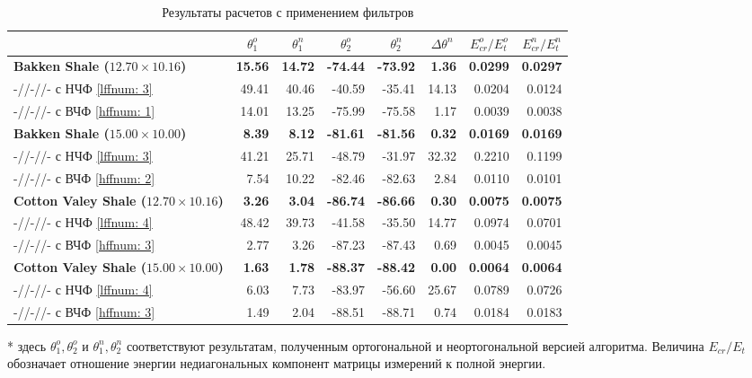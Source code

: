 \documentclass[a4paper,11pt]{article}
\begin{document}
\begin{table}[h]
\footnotesize
\centering
\caption{Результаты расчетов с применением фильтров}
\renewcommand{\arraystretch}{1.5}
\begin{tabularx}{\textwidth}{|X|rr|rr|r|rr|}
\hline
				&\multicolumn{1}{c}{$\theta_1^o$} & \multicolumn{1}{c|}{$\theta_1^n$} & \multicolumn{1}{c}{$\theta_2^o$} & \multicolumn{1}{c|}{$\theta_2^n$} & \multicolumn{1}{c|}{$\Delta\theta^n$}& \multicolumn{1}{c}{$E_{cr}^o/E_{t}^o$} & \multicolumn{1}{c|}{$E_{cr}^n/E_{t}^n$} \\ \hline
\hline	\textbf{Bakken Shale ($12.70 \times 10.16$)} & \textbf{15.56} & \textbf{14.72} & \textbf{-74.44}  & \textbf{-73.92}  & \textbf{1.36}  & \textbf{0.0299} & \textbf{0.0297} \\
		-//-//- с НЧФ \ref{lffnum: 3} & 49.41 & 40.46 & -40.59 & -35.41  & 14.13 & 0.0204 & 0.0124\\
		-//-//- с ВЧФ \ref{hffnum: 1} & 14.01 & 13.25 & -75.99 & -75.58  & 1.17 & 0.0039 & 0.0038\\
\hline	\textbf{Bakken Shale ($15.00 \times 10.00$)} & \textbf{8.39} & \textbf{8.12} & \textbf{-81.61}  & \textbf{-81.56} & \textbf{0.32}  & \textbf{0.0169} & \textbf{0.0169} \\
		-//-//- с НЧФ \ref{lffnum: 3} & 41.21 & 25.71 & -48.79 & -31.97  & 32.32 & 0.2210 & 0.1199\\
		-//-//- с ВЧФ \ref{hffnum: 2} & 7.54 & 10.22 & -82.46 & -82.63  & 2.84 & 0.0110 & 0.0101\\
\hline	\textbf{Cotton Valey Shale ($12.70 \times 10.16$)} & \textbf{3.26} & \textbf{3.04} & \textbf{-86.74}  & \textbf{-86.66}  & \textbf{0.30}  & \textbf{0.0075} & \textbf{0.0075}\\
		-//-//- с НЧФ \ref{lffnum: 4} & 48.42 & 39.73 & -41.58 & -35.50  & 14.77  & 0.0974 & 0.0701 \\
		-//-//- с ВЧФ \ref{hffnum: 3} & 2.77 & 3.26 & -87.23 & -87.43  & 0.69  & 0.0045 & 0.0045\\	
\hline	\textbf{Cotton Valey Shale ($15.00 \times 10.00$)} & \textbf{1.63} & \textbf{1.78} & \textbf{-88.37}  & \textbf{-88.42}  & \textbf{0.00}  & \textbf{0.0064} & \textbf{0.0064} \\
		-//-//- с НЧФ \ref{lffnum: 4} & 6.03 & 7.73 & -83.97 & -56.60  & 25.67  & 0.0789 & 0.0726 \\
		-//-//- с ВЧФ \ref{hffnum: 3} & 1.49 & 2.04 & -88.51 & -88.71  & 0.74  & 0.0184 & 0.0183\\		
\hline	
\end{tabularx} 
\begin{flushleft}
* здесь $\theta_1^o,\theta_2^o$ и $\theta_1^n,\theta_2^n$ соответствуют результатам, полученным ортогональной и неортогональной версией алгоритма. Величина $E_{cr}/E_{t}$ обозначает отношение энергии недиагональных компонент матрицы измерений к полной энергии.
\end{flushleft}
\label{tab:filter_process_results}
\renewcommand{\arraystretch}{1.0}
\end{table}
\end{document}

